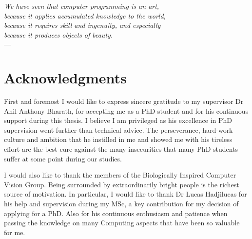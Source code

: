 
\begin{flushright}{\slshape    
    We have seen that computer programming is an art, \\ 
    because it applies accumulated knowledge to the world, \\ 
    because it requires skill and ingenuity, and especially \\
    because it produces objects of beauty.} \\ \medskip
    ---  \citep{knuth:1974}
\end{flushright}



\bigskip

\begingroup
\let\clearpage\relax
\let\cleardoublepage\relax
\let\cleardoublepage\relax
\chapter*{Acknowledgments}

First and foremost I would like to express sincere gratitude to my supervisor Dr Anil Anthony Bharath, for accepting me as a PhD student and for his continuous support during this thesis. I believe I am privileged as his excellence in PhD supervision went further than technical advice. The perseverance, hard-work culture and ambition that he instilled in me and showed me with his tireless effort are the best cure against the many insecurities that many PhD students suffer at some point during our studies.

I would also like to thank the members of the Biologically Inspired Computer Vision Group. Being surrounded by extraordinarily bright people is the richest source of motivation. In particular, I would like to thank Dr Lucas Hadjilucas for his help and supervision during my MSc, a key contribution for my decision of applying for a PhD. Also for his continuous enthusiasm and patience when passing the knowledge on many Computing aspects that have been so valuable for me.
\endgroup



